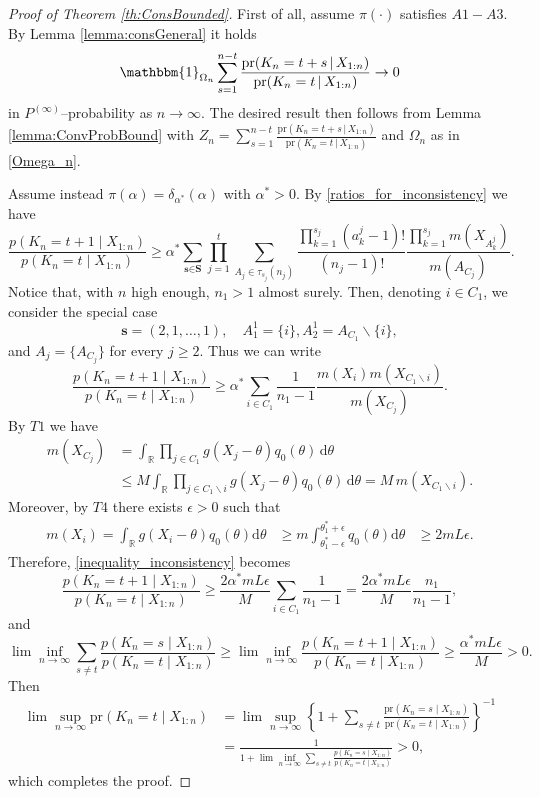 \documentclass[12pt]{article}
\def \R {\mathbb{R} }
\def \d {\mathrm{d}}
\begin{document}
\begin{proof}[Proof of Theorem \ref{th:ConsBounded}] First of all, assume $\pi(\cdot)$ satisfies $A1-A3$. By Lemma \ref{lemma:consGeneral} it holds
\[
\mathbbm{1}_{\Omega_n}\sum_{s = 1}^{n-t} \frac{\text{pr}(K_{n} = t+s \, | \, X_{1:n})}{\text{pr}(K_{n} = t \, | \, X_{1:n})} \to 0
\]
in $P^{(\infty)}$--probability as $n \to \infty$. The desired result then follows from Lemma \ref{lemma:ConvProbBound} with $Z_n = \sum_{s = 1}^{n-t} \frac{\text{pr}(K_{n} = t+s \, | \, X_{1:n})}{\text{pr}(K_{n} =t \, | \, X_{1:n})}$ and $\Omega_n$ as in \eqref{Omega_n}.

Assume instead $\pi(\alpha) = \delta_{\alpha^*}(\alpha)$ with $\alpha^* > 0$. By \eqref{ratios_for_inconsistency} we have
\[
\frac{p(K_n = t+1 \mid X_{1:n})}{p(K_n = t \mid X_{1:n})} \geq \alpha^*\sum_{\textbf{s} \in \textbf{S}}\prod_{j = 1}^t\sum_{A_j \in \tau_{s_j}(n_j)}\frac{\prod_{k=1}^{s_j}(a^j_k-1)!}{(n_j-1)!}\frac{\prod_{k=1}^{s_j} m(X_{A^j_k})}{m(A_{C_j})}.
\]
Notice that, with $n$ high enough, $n_1 > 1$ almost surely. Then, denoting $i \in C_1$, we consider the special case
\[
\textbf{s} = (2,1, \dots, 1), \quad A^1_1 = \{i\}, A_2^1 = A_{C_1} \backslash \{i\},
\]
and $A_j = \{A_{C_j}\}$ for every $j \geq 2$. Thus we can write
\begin{equation}\label{inequality_inconsistency}
\frac{p(K_n = t+1 \mid X_{1:n})}{p(K_n = t \mid X_{1:n})} \geq \alpha^*\sum_{i \in C_1}\frac{1}{n_1-1}\frac{m(X_i)m\left(X_{C_1 \backslash i} \right)}{m\left(X_{C_j} \right)}.
\end{equation}
By $T1$ we have
\[
\begin{aligned}
m\left(X_{C_j} \right) &= \int_{\R} \prod_{j \in C_1}g(X_j-\theta)q_0(\theta) \, \d \theta\\
& \leq M \int_{\R} \prod_{j \in C_1 \backslash i}g(X_j-\theta)q_0(\theta) \, \d \theta = M \, m\left(X_{C_1 \backslash i} \right).
\end{aligned}
\]
Moreover, by $T4$ there exists $\epsilon > 0$ such that
\[
\begin{aligned}
m(X_i) = \int_{\R} g(X_i -\theta) q_0(\theta) \d \theta &\geq m \int_{\theta_1^*-\epsilon}^{\theta_1^* + \epsilon}q_0(\theta) \d \theta
&\geq 2mL\epsilon.
\end{aligned}
\]
Therefore, \eqref{inequality_inconsistency} becomes
\[
\frac{p(K_n = t+1 \mid X_{1:n})}{p(K_n = t \mid X_{1:n})} \geq \frac{2\alpha^*mL\epsilon}{M}\sum_{i \in C_1}\frac{1}{n_1-1} = \frac{2\alpha^*mL\epsilon}{M}\frac{n_1}{n_1-1},
\]
and
\[
\lim \inf_{n \to \infty} \sum_{s \neq t}\frac{p(K_n = s \mid X_{1:n})}{p(K_n = t \mid X_{1:n})} \geq \lim \inf_{n \to \infty} \frac{p(K_n = t+1 \mid X_{1:n})}{p(K_n = t \mid X_{1:n})} \geq \frac{\alpha^*mL\epsilon}{M} > 0.
\]
Then
\[
\begin{aligned}
\lim \sup_{n \to \infty} \text{pr}(K_n = t \mid X_{1:n}) &= \lim \sup_{n \to \infty} \left\{1+\sum_{s \neq t} \frac{\text{pr}(K_n = s \mid X_{1:n} )}{\text{pr}(K_n = t \mid X_{1:n})}\right\}^{-1}\\
& = \frac{1}{1+\lim \inf_{n \to \infty} \sum_{s \neq t}\frac{p(K_n = s \mid X_{1:n})}{p(K_n = t \mid X_{1:n})}} > 0,
\end{aligned}
\]
which completes the proof.
\end{proof}
\end{document}

